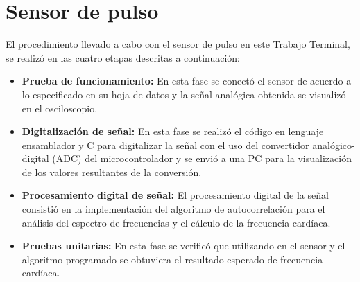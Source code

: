 
\section{Sensor de pulso}

El procedimiento llevado a cabo con el sensor de pulso en este Trabajo Terminal, se realizó en las cuatro etapas descritas a continuación:


\begin{itemize}
	\item \textbf{Prueba de funcionamiento:} En esta fase se conectó el sensor de acuerdo a lo especificado en su hoja de datos y la señal analógica obtenida se visualizó en el osciloscopio.
	\item \textbf{Digitalización de señal:} En esta fase se realizó el código en lenguaje ensamblador y C para digitalizar la señal con el uso del convertidor analógico-digital (ADC) del microcontrolador y se envió a una PC para la visualización de los valores resultantes de la conversión.
	\item \textbf{Procesamiento digital de señal:} El procesamiento digital de la señal consistió en la implementación del algoritmo de autocorrelación para el análisis del espectro de frecuencias y el cálculo de la frecuencia cardíaca.
	\item \textbf{Pruebas unitarias:} En esta fase se verificó que utilizando en el sensor y el algoritmo programado se obtuviera el resultado esperado de frecuencia cardíaca.
\end{itemize}

